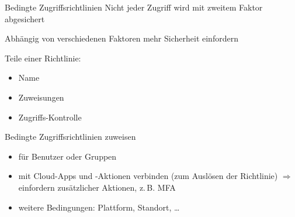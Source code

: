 \begin{flashcard}[Definition]{Bedingte Zugriffsrichtlinien}
    Nicht jeder Zugriff wird mit zweitem Faktor abgesichert

    \vspace{1cm}
    Abhängig von verschiedenen Faktoren mehr Sicherheit einfordern

    \vspace{1cm}
    Teile einer Richtlinie:
    \begin{itemize}
        \item Name
        \item Zuweisungen
        \item Zugriffs-Kontrolle
    \end{itemize}

\end{flashcard}

\begin{flashcard}[Definition]{Bedingte Zugriffsrichtlinien zuweisen}
    \begin{itemize}
        \item für Benutzer oder Gruppen
        \item mit Cloud-Apps und -Aktionen verbinden (zum Auslösen der Richtlinie)\newline
            $\Rightarrow$ einfordern zusätzlicher Aktionen, z.\,B. MFA
        \item weitere Bedingungen:\newline
            Plattform, Standort, \ldots
    \end{itemize}
\end{flashcard}

